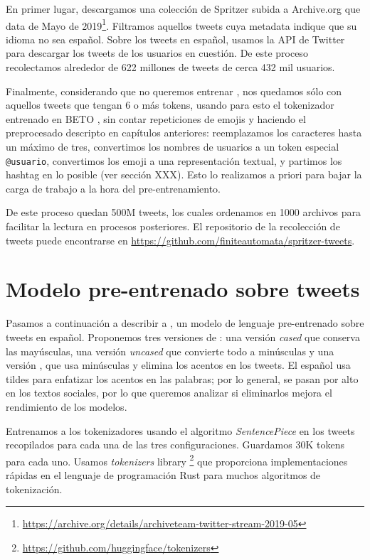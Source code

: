 En primer lugar, descargamos una colección de Spritzer subida a Archive.org que data de Mayo de 2019\footnote{\url{https://archive.org/details/archiveteam-twitter-stream-2019-05}}. Filtramos aquellos tweets cuya metadata indique que su idioma no sea español. Sobre los tweets en español, usamos la API de Twitter para descargar los tweets de los usuarios en cuestión. De este proceso recolectamos alrededor de 622 millones de tweets de cerca 432 mil usuarios.

Finalmente, considerando que no queremos entrenar , nos quedamos sólo con aquellos tweets que tengan 6 o más tokens, usando para esto el tokenizador entrenado en BETO \cite{canete2020spanish}, sin contar repeticiones de emojis y haciendo el preprocesado descripto en capítulos anteriores: reemplazamos los caracteres hasta un máximo de tres, convertimos los nombres de usuarios a un token especial \verb|@usuario|, convertimos los emoji a una representación textual, y partimos los hashtag en lo posible (ver sección XXX). Esto lo realizamos a priori para bajar la carga de trabajo a la hora del pre-entrenamiento.

De este proceso quedan 500M tweets, los cuales ordenamos en 1000 archivos para facilitar la lectura en procesos posteriores. El repositorio de la recolección de tweets puede encontrarse en \url{https://github.com/finiteautomata/spritzer-tweets}.




\section{Modelo pre-entrenado sobre tweets}

Pasamos a continuación a describir a \robertuito{}, un modelo de lenguaje pre-entrenado sobre tweets en español. Proponemos tres versiones de \robertuito{}: una versión \emph{cased} que conserva las mayúsculas, una versión \emph{uncased} que convierte todo a minúsculas y una versión \deacc{}, que usa minúsculas y elimina los acentos en los tweets. El español usa tildes para enfatizar los acentos en las palabras; por lo general, se pasan por alto en los textos sociales, por lo que queremos analizar si eliminarlos mejora el rendimiento de los modelos.

Entrenamos a los tokenizadores usando el algoritmo \emph{SentencePiece} en los tweets recopilados para cada una de las tres configuraciones. Guardamos 30K tokens para cada uno. Usamos \emph{tokenizers} library \footnote{\url{https://github.com/huggingface/tokenizers}} que proporciona implementaciones rápidas en el lenguaje de programación Rust para muchos algoritmos de tokenización.

